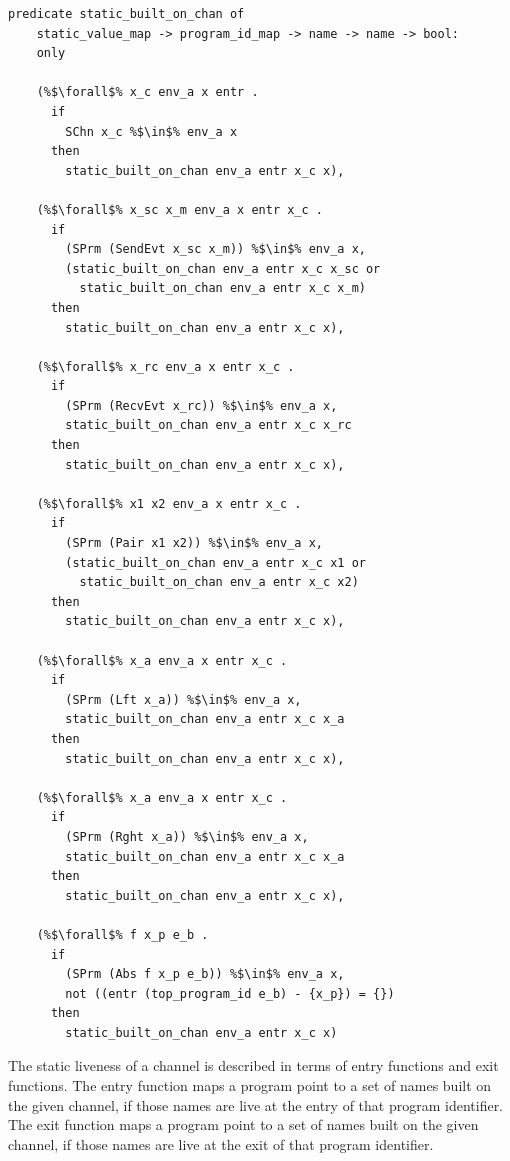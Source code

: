 \documentclass{article}
\begin{document}
\begin{lstlisting}[language=logic, escapechar=\%]
  predicate static_built_on_chan of
    static_value_map -> program_id_map -> name -> name -> bool:
    only

    (%$\forall$% x_c env_a x entr .
      if 
        SChn x_c %$\in$% env_a x 
      then 
        static_built_on_chan env_a entr x_c x),

    (%$\forall$% x_sc x_m env_a x entr x_c . 
      if
        (SPrm (SendEvt x_sc x_m)) %$\in$% env_a x,
        (static_built_on_chan env_a entr x_c x_sc or
          static_built_on_chan env_a entr x_c x_m)
      then 
        static_built_on_chan env_a entr x_c x),

    (%$\forall$% x_rc env_a x entr x_c . 
      if  
        (SPrm (RecvEvt x_rc)) %$\in$% env_a x,
        static_built_on_chan env_a entr x_c x_rc
      then 
        static_built_on_chan env_a entr x_c x),

    (%$\forall$% x1 x2 env_a x entr x_c . 
      if  
        (SPrm (Pair x1 x2)) %$\in$% env_a x,
        (static_built_on_chan env_a entr x_c x1 or
          static_built_on_chan env_a entr x_c x2)
      then 
        static_built_on_chan env_a entr x_c x),

    (%$\forall$% x_a env_a x entr x_c .
      if
        (SPrm (Lft x_a)) %$\in$% env_a x,
        static_built_on_chan env_a entr x_c x_a
      then 
        static_built_on_chan env_a entr x_c x),

    (%$\forall$% x_a env_a x entr x_c .
      if
        (SPrm (Rght x_a)) %$\in$% env_a x,
        static_built_on_chan env_a entr x_c x_a
      then 
        static_built_on_chan env_a entr x_c x),

    (%$\forall$% f x_p e_b .
      if
        (SPrm (Abs f x_p e_b)) %$\in$% env_a x,
        not ((entr (top_program_id e_b) - {x_p}) = {})
      then
        static_built_on_chan env_a entr x_c x)
  \end{lstlisting}


The static liveness of a channel is described in terms of entry functions and
exit functions. The entry function maps a program point to a set of names built on
the given channel, if those names are live at the entry of that program identifier.
The exit function maps a program point to a
set of names built on the given channel, if those names are live at the exit of that
program identifier.
\end{document}

